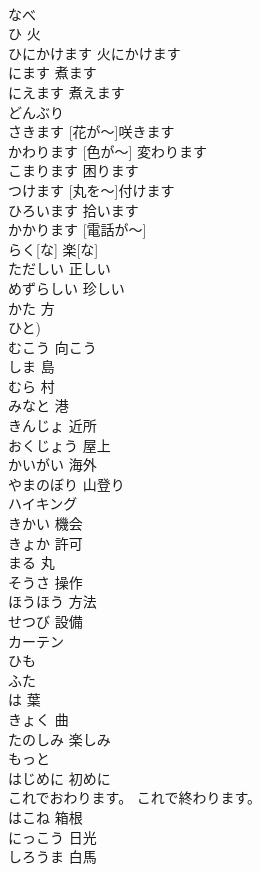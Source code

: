 \documentclass[8pt]{extreport}
\begin{document}
\begin{CJK}{UTF8}{min}
\\	なべ			
\\	ひ	火	
\\	ひにかけます	火にかけます	
\\	にます	煮ます	
\\	にえます	煮えます	
\\	どんぶり			
\\	[はなが～]さきます	[花が～]咲きます	
\\	[いろが～] かわります	[色が～] 変わります	
\\	こまります	困ります	
\\	[まるを～] つけます	[丸を～]付けます	
\\	ひろいます	拾います	
\\	[でんわが～]かかります	[電話が～]	
\\	らく[な]	楽[な]	
\\	ただしい	正しい	
\\	めずらしい	珍しい	
\\	かた	方	
\\	ひと)		
\\	むこう	向こう	
\\	しま	島	
\\	むら	村	
\\	みなと	港	
\\	きんじょ	近所	
\\	おくじょう	屋上	
\\	かいがい	海外	
\\	やまのぼり	山登り	
\\	ハイキング			
\\	きかい	機会	
\\	きょか	許可	
\\	まる	丸	
\\	そうさ	操作	
\\	ほうほう	方法	
\\	せつび	設備	
\\	カーテン			
\\	ひも			
\\	ふた			
\\	は	葉	
\\	きょく	曲	
\\	たのしみ	楽しみ	
\\	もっと			
\\	はじめに	初めに	
\\	これでおわります。	これで終わります。	
\\	はこね	箱根	
\\	にっこう	日光	
\\	しろうま	白馬	

\end{CJK}
\end{document}
